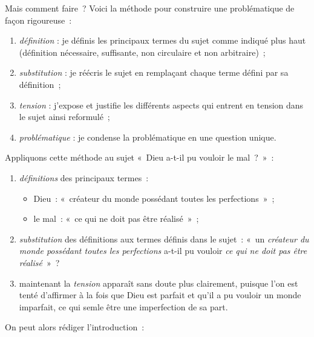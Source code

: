 \documentclass[a4paper,12pt]{article}
\begin{document}
Mais comment faire ? Voici la méthode pour construire une problématique
de façon rigoureuse :

\begin{enumerate}
\item \emph{définition} : je définis les principaux termes du sujet comme
indiqué plus haut (définition nécessaire, suffisante, non circulaire
et non arbitraire) ;

\item \emph{substitution} : je réécris le sujet en remplaçant chaque terme
défini par sa définition ;

\item \emph{tension} : j'expose et justifie les différents aspects qui entrent
en tension dans le sujet ainsi reformulé ;

\item \emph{problématique} : je condense la problématique en une question
unique.
\end{enumerate}

\noindent Appliquons cette méthode au sujet « Dieu a-t-il pu vouloir le
mal ? » :

\begin{enumerate}
\item \emph{définitions} des principaux termes :

\begin{itemize}
\item Dieu : « créateur du monde possédant toutes les perfections » ;

\item le mal : « ce qui ne doit pas être réalisé » ;
\end{itemize}

\item \emph{substitution} des définitions aux termes définis dans le sujet :
« un \emph{créateur du monde possédant toutes les perfections} a-t-il pu
vouloir \emph{ce qui ne doit pas être réalisé} » ?

\item maintenant la \emph{tension} apparaît sans doute plus clairement, puisque
l'on est tenté d'affirmer à la fois que Dieu est parfait et qu'il a
pu vouloir un monde imparfait, ce qui semle être une imperfection de
sa part.
\end{enumerate}

\noindent On peut alors rédiger l'introduction :
\end{document}
